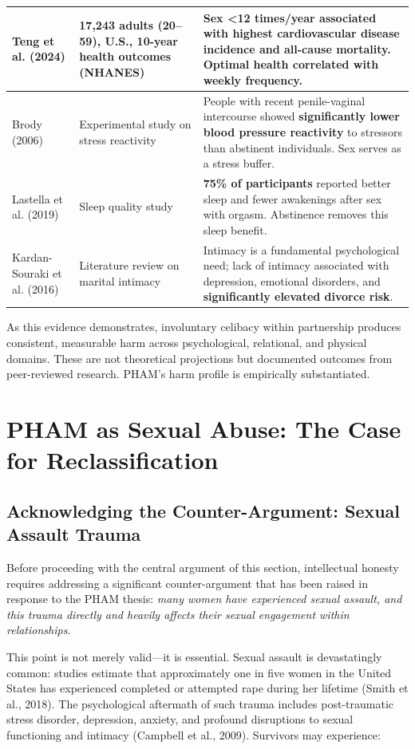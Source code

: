 \documentclass[12pt,openany]{book}
\numberwithin{equation}{chapter}
\begin{document}
\begin{longtable}{|p{2.8cm}|p{3.5cm}|p{7.5cm}|}
Teng et al. (2024) & 17,243 adults (20--59), U.S., 10-year health outcomes (NHANES) & Sex \textless12 times/year associated with \textbf{highest cardiovascular disease incidence and all-cause mortality}. Optimal health correlated with weekly frequency. \\
\hline

Brody (2006) & Experimental study on stress reactivity & People with recent penile-vaginal intercourse showed \textbf{significantly lower blood pressure reactivity} to stressors than abstinent individuals. Sex serves as a stress buffer. \\
\hline

Lastella et al. (2019) & Sleep quality study & \textbf{75\% of participants} reported better sleep and fewer awakenings after sex with orgasm. Abstinence removes this sleep benefit. \\
\hline

Kardan-Souraki et al. (2016) & Literature review on marital intimacy & Intimacy is a fundamental psychological need; lack of intimacy associated with depression, emotional disorders, and \textbf{significantly elevated divorce risk}. \\
\hline
\end{longtable}

\noindent As this evidence demonstrates, involuntary celibacy within partnership produces consistent, measurable harm across psychological, relational, and physical domains. These are not theoretical projections but documented outcomes from peer-reviewed research. PHAM's harm profile is empirically substantiated.

\section{PHAM as Sexual Abuse: The Case for Reclassification}

\subsection{Acknowledging the Counter-Argument: Sexual Assault Trauma}

Before proceeding with the central argument of this section, intellectual honesty requires addressing a significant counter-argument that has been raised in response to the PHAM thesis: \textit{many women have experienced sexual assault, and this trauma directly and heavily affects their sexual engagement within relationships}.

This point is not merely valid---it is essential. Sexual assault is devastatingly common: studies estimate that approximately one in five women in the United States has experienced completed or attempted rape during her lifetime (Smith et al., 2018). The psychological aftermath of such trauma includes post-traumatic stress disorder, depression, anxiety, and profound disruptions to sexual functioning and intimacy (Campbell et al., 2009). Survivors may experience:
\end{document}
